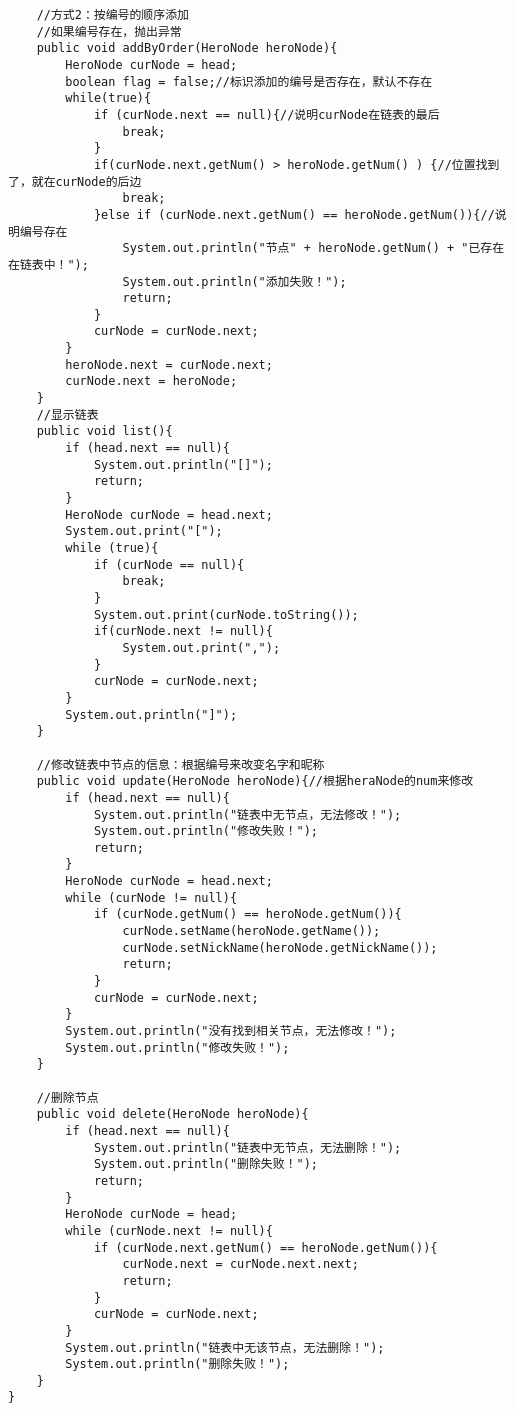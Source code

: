 \documentclass[a4paper]{report}
\begin{document}
\begin{lstlisting}
    //方式2：按编号的顺序添加
    //如果编号存在，抛出异常
    public void addByOrder(HeroNode heroNode){
        HeroNode curNode = head;
        boolean flag = false;//标识添加的编号是否存在，默认不存在
        while(true){
            if (curNode.next == null){//说明curNode在链表的最后
                break;
            }
            if(curNode.next.getNum() > heroNode.getNum() ) {//位置找到了，就在curNode的后边
                break;
            }else if (curNode.next.getNum() == heroNode.getNum()){//说明编号存在
                System.out.println("节点" + heroNode.getNum() + "已存在在链表中！");
                System.out.println("添加失败！");
                return;
            }
            curNode = curNode.next;
        }
        heroNode.next = curNode.next;
        curNode.next = heroNode;
    }
    //显示链表
    public void list(){
        if (head.next == null){
            System.out.println("[]");
            return;
        }
        HeroNode curNode = head.next;
        System.out.print("[");
        while (true){
            if (curNode == null){
                break;
            }
            System.out.print(curNode.toString());
            if(curNode.next != null){
                System.out.print(",");
            }
            curNode = curNode.next;
        }
        System.out.println("]");
    }

    //修改链表中节点的信息：根据编号来改变名字和昵称
    public void update(HeroNode heroNode){//根据heraNode的num来修改
        if (head.next == null){
            System.out.println("链表中无节点，无法修改！");
            System.out.println("修改失败！");
            return;
        }
        HeroNode curNode = head.next;
        while (curNode != null){
            if (curNode.getNum() == heroNode.getNum()){
                curNode.setName(heroNode.getName());
                curNode.setNickName(heroNode.getNickName());
                return;
            }
            curNode = curNode.next;
        }
        System.out.println("没有找到相关节点，无法修改！");
        System.out.println("修改失败！");
    }

    //删除节点
    public void delete(HeroNode heroNode){
        if (head.next == null){
            System.out.println("链表中无节点，无法删除！");
            System.out.println("删除失败！");
            return;
        }
        HeroNode curNode = head;
        while (curNode.next != null){
            if (curNode.next.getNum() == heroNode.getNum()){
                curNode.next = curNode.next.next;
                return;
            }
            curNode = curNode.next;
        }
        System.out.println("链表中无该节点，无法删除！");
        System.out.println("删除失败！");
    }
}


\end{lstlisting}
\end{document}
